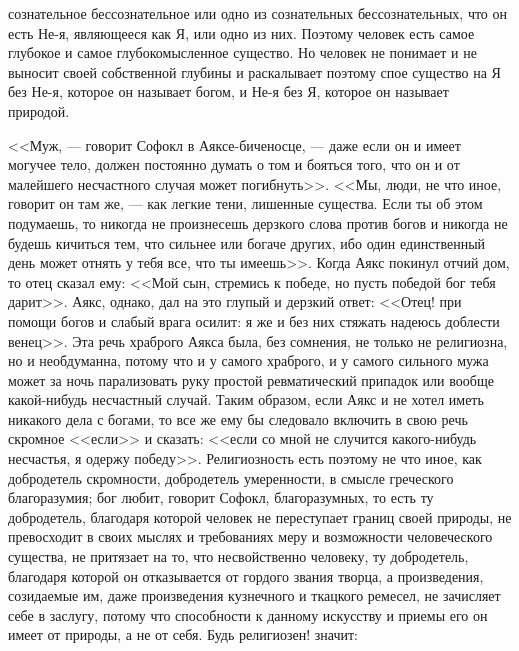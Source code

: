 \documentclass[12pt]{article}
\begin{document}
сознательное бессознательное или одно из сознательных бессознательных, что он есть Не-я, являющееся как Я, или одно из них. Поэтому человек есть самое глубокое и самое глубокомысленное существо. Но человек не понимает и не выносит своей собственной глубины и раскалывает поэтому спое существо на Я без Не-я, которое он называет богом, и Не-я без Я, которое он называет природой. 

<<Муж, --- говорит Софокл в Аяксе-биченосце, --- даже если он и имеет могучее тело, должен постоянно думать о том и бояться того, что он и от малейшего несчастного случая может погибнуть>>. <<Мы, люди, не что иное, говорит он там же, --- как легкие тени, лишенные существа. Если ты об этом подумаешь, то никогда не произнесешь дерзкого слова против богов и никогда не будешь кичиться тем, что сильнее или богаче других, ибо один единственный день может отнять у тебя все, что ты имеешь>>. Когда Аякс покинул отчий дом, то отец сказал ему: <<Мой сын, стремись к победе, но пусть победой бог тебя дарит>>. Аякс, однако, дал на это глупый и дерзкий ответ: <<Отец! при помощи богов и слабый врага осилит: я же и без них стяжать надеюсь доблести венец>>. Эта речь храброго Аякса была, без сомнения, не только не религиозна, но и необдуманна, потому что и у самого храброго, и у самого сильного мужа может за ночь парализовать руку простой ревматический припадок или вообще какой-нибудь несчастный случай. Таким образом, если Аякс и не хотел иметь никакого дела с богами, то все же ему бы следовало включить в свою речь скромное <<если>> и сказать: <<если со мной не случится какого-нибудь несчастья, я одержу победу>>. Религиозность есть поэтому не что иное, как добродетель скромности, добродетель умеренности, в смысле греческого благоразумия; бог любит, говорит Софокл, благоразумных, то есть ту добродетель, благодаря которой человек не переступает границ своей природы, не превосходит в своих мыслях и требованиях меру и возможности человеческого существа, не притязает на то, что несвойственно человеку, ту добродетель, благодаря которой он отказывается от гордого звания творца, а произведения, созидаемые им, даже произведения кузнечного и ткацкого ремесел, не зачисляет себе в заслугу, потому что способности к данному искусству и приемы его он имеет от природы, а не от себя. Будь религиозен! значит: 
\end{document}
